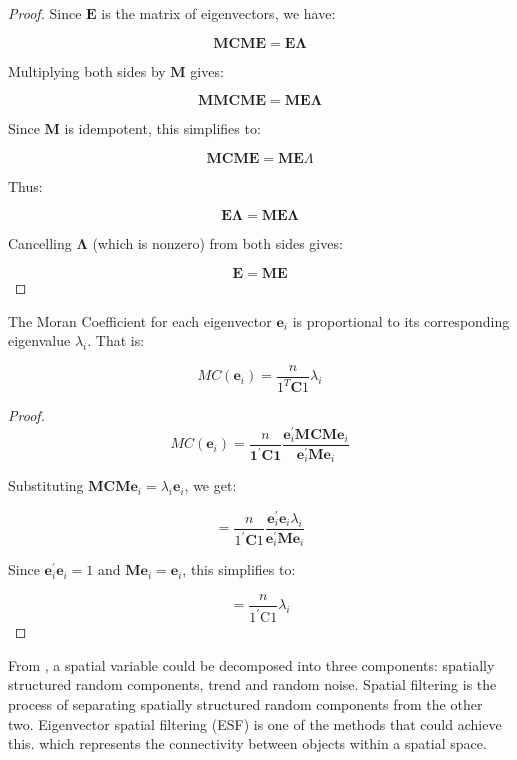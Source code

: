 \documentclass[12pt]{article}
\begin{document}
\begin{proof}

  Since \(\mathbf{E}\) is the matrix of eigenvectors, we have:

  \[
    \mathbf{M C M E}=\mathbf{E} \boldsymbol{\Lambda}
  \]

  Multiplying both sides by \(\mathbf{M}\) gives:

  \[
    \mathbf{MMCME}=\mathbf{ME} \boldsymbol{\Lambda}
  \]

  Since \(\mathbf{M}\) is idempotent, this simplifies to:

  \[
    \mathbf{MCME}=\mathbf{ME} \Lambda
  \]

  Thus:

  \[
    \mathbf{E} \boldsymbol{\Lambda}=\mathbf{M E} \boldsymbol{\Lambda}
  \]

  Cancelling \(\boldsymbol{\Lambda}\) (which is nonzero) from both sides gives:

  \[
    \mathbf{E}=\mathbf{M E}
  \]

\end{proof}

The Moran Coefficient for each eigenvector \(\mathbf{e}_i\) is proportional to its corresponding eigenvalue \(\lambda_i\). That is:

\[
  M C\left(\mathbf{e}_i\right)=\frac{n}{1^T \mathbf{C} 1} \lambda_i
\]

\begin{proof}

  \[
    M C\left(\mathbf{e}_i\right)=\frac{n}{\mathbf{1}^{\prime} \mathbf{C} \mathbf{1}} \frac{\mathbf{e}_i^{\prime} \mathbf{M C M e}_i}{\mathbf{e}_i^{\prime} \mathbf{M e}_i}
  \]

  Substituting \(\mathbf{M C M e}_i=\lambda_i \mathbf{e}_i\), we get:

  \[
    =\frac{n}{1^{\prime} \mathbf{C} 1} \frac{\mathbf{e}_i^{\prime} \mathbf{e}_i \lambda_i}{\mathbf{e}_i^{\prime} \mathbf{M e}_i}
  \]

  Since \(\mathbf{e}_i^{\prime} \mathbf{e}_i=1\) and \(\mathbf{M e}_i=\mathbf{e}_i\), this simplifies to:

  \[
    =\frac{n}{1^{\prime} \mathrm{C} 1} \lambda_i
  \]
\end{proof}


From \cite{Griffith_Chun_2014}, a spatial variable could be decomposed into three components: spatially structured random components, trend and random noise. Spatial filtering is the process of separating spatially structured random components from the other two. Eigenvector spatial filtering (ESF) is one of the methods that could achieve this. which represents the connectivity between objects within a spatial space. 
\end{document}
